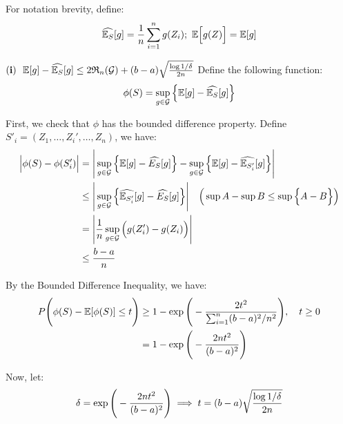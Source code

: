\begin{proof*}
    For notation brevity, define:
    \begin{align*}
        \widehat{\E_S}[g] = \frac{1}{n}\sum_{i=1}^n g(Z_i); \ \E\bigSquare{g(Z)} = \E[g]
    \end{align*}
    
    \begin{subproof}{\newline ${\bf (i)} \ \ \mathbb{E}[g] - \widehat{\mathbb{E}_S}[g] \le 2\mathfrak{R}_n(\mathcal{G}) + (b-a)\sqrt{\frac{\log1/\delta}{2n}}$}
        Define the following function:
        \begin{align*}
            \phi(S) = \sup_{g\in\mathcal{G}} \Big\{ 
                \mathbb{E}[g] - \widehat{\mathbb{E}_S}[g]
             \Big\}
        \end{align*}

        \noindent First, we check that $\phi$ has the bounded difference property. Define $S'_i=(Z_1, \dots, Z_i', \dots, Z_n)$, we have:
        \begin{align*}
            \Big| \phi(S) - \phi(S'_i) \Big| 
                &= \Bigg| 
                    \sup_{g\in\mathcal{G}} \Big\{ \mathbb{E}[g] - \widehat{E_S}[g] \Big\} - \sup_{g\in\mathcal{G}}\Big\{ \mathbb{E}[g] - \widehat{\mathbb{E}_{S_i'}}[g] \Big\}
                 \Bigg| \\
                &\le \Bigg| 
                    \sup_{g\in\mathcal{G}} \Big\{  \widehat{\mathbb{E}_{S_i'}}[g] - \widehat{E_S}[g]  \Big\}
                 \Bigg| \ \ \ \Big(\sup A - \sup B \le \sup \Big\{ A - B \Big\} \Big) \\
                &= \Bigg| 
                    \frac{1}{n} \sup_{g\in\mathcal{G}} \Big(  g(Z_i') - g(Z_i)  \Big)
                 \Bigg| \\
                &\le \frac{b-a}{n}
        \end{align*}

        \noindent By the Bounded Difference Inequality, we have:
        \begin{align*}
            P\Bigg( 
                \phi(S) - \mathbb{E}[\phi(S)] \le t
             \Bigg) &\ge 1 - \exp\Bigg( 
                -\frac{2t^2}{\sum_{i=1}^n (b - a)^2/n^2}
             \Bigg), \ \ \ t\ge 0 \\
            &= 1 - \exp\Bigg( 
                -\frac{2nt^2}{(b - a)^2}
             \Bigg)
        \end{align*}

        \noindent Now, let:
        \begin{align*}
            \delta = \exp\Bigg( 
                -\frac{2nt^2}{(b - a)^2}
             \Bigg) \implies t = (b-a)\sqrt{
                \frac{\log 1/\delta}{2n}
            }
        \end{align*}


\end{subproof}
\end{proof*}
